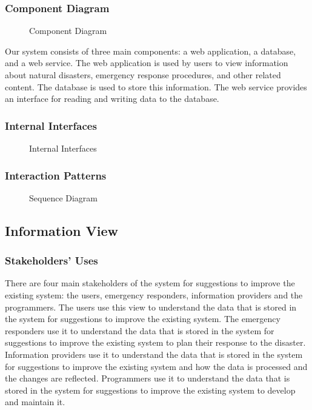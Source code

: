 \documentclass[a4paper]{article}
\begin{document}
    \subsubsection{Component Diagram}
    \begin{figure}
        
        \caption{Component Diagram}
    \end{figure}

    Our system consists of three main components: a web application, a database, and a web service. The web application is used by
    users to view information about natural disasters, emergency response procedures, and other related content. The database is
    used to store this information. The web service provides an interface for reading and writing data to the database.

    \subsubsection{Internal Interfaces}
    \begin{figure}
        
        \caption{Internal Interfaces}
    \end{figure}
    \subsubsection{Interaction Patterns}
    \begin{figure}
        
        \caption{Sequence Diagram}
    \end{figure}
    \subsection{Information View}
    \subsubsection{Stakeholders' Uses}
    There are four main stakeholders of the system for suggestions to improve the existing system: the users, emergency responders,
    information providers and the programmers. The users use this view to understand the data that is stored in the system for
    suggestions to improve the existing system. The emergency responders use it to understand the data that is stored in the system
    for suggestions to improve the existing system to plan their response to the disaster. Information providers use it to
    understand the data that is stored in the system for suggestions to improve the existing system and how the data is processed
    and the changes are reflected. Programmers use it to understand the data that is stored in the system for suggestions to
    improve the existing system to develop and maintain it.
\end{document}
